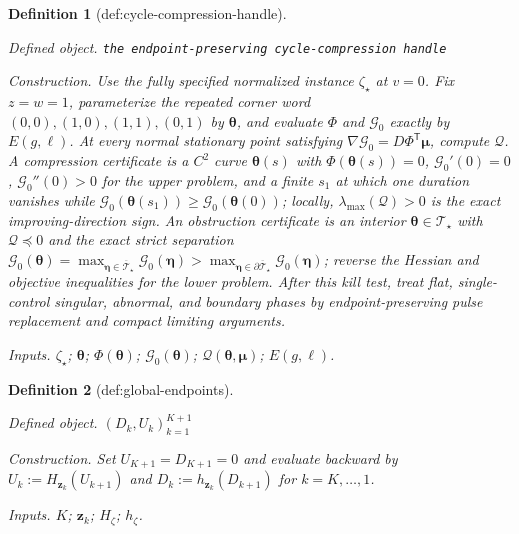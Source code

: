 \documentclass{article}
\newtheorem{definition}{Definition}
\begin{document}
\begin{definition}[def:cycle-compression-handle]\label{def:cycle-compression-handle}
\par\smallskip\noindent\emph{Defined object.} \texttt{the endpoint-\allowbreak{}preserving cycle-\allowbreak{}compression handle}
\par\smallskip\noindent\emph{Construction.} Use the fully specified normalized instance \(\zeta_\star\) at \(v=0\). Fix \(z=w=1\), parameterize the repeated corner word \((0,0),(1,0),(1,1),(0,1)\) by \(\boldsymbol\theta\), and evaluate \(\Phi\) and \(\mathcal G_0\) exactly by \(E(g,\ell)\). At every normal stationary point satisfying \(\nabla\mathcal G_0=D\Phi^{\mathsf T}\boldsymbol\mu\), compute \(\mathscr Q\). A compression certificate is a \(C^2\) curve \(\boldsymbol\theta(s)\) with \(\Phi(\boldsymbol\theta(s))=0\), \(\mathcal G_0'(0)=0\), \(\mathcal G_0''(0)>0\) for the upper problem, and a finite \(s_1\) at which one duration vanishes while \(\mathcal G_0(\boldsymbol\theta(s_1))\ge\mathcal G_0(\boldsymbol\theta(0))\); locally, \(\lambda_{\max}(\mathscr Q)>0\) is the exact improving-direction sign. An obstruction certificate is an interior \(\boldsymbol\theta\in\mathcal T_\star\) with \(\mathscr Q\preceq0\) and the exact strict separation \(\mathcal G_0(\boldsymbol\theta)=\max_{\boldsymbol\eta\in\overline{\mathcal T}_\star}\mathcal G_0(\boldsymbol\eta)>\max_{\boldsymbol\eta\in\partial\overline{\mathcal T}_\star}\mathcal G_0(\boldsymbol\eta)\); reverse the Hessian and objective inequalities for the lower problem. After this kill test, treat flat, single-control singular, abnormal, and boundary phases by endpoint-preserving pulse replacement and compact limiting arguments.
\par\smallskip\noindent\emph{Inputs.} \(\zeta_\star\); \(\boldsymbol\theta\); \(\Phi(\boldsymbol\theta)\); \(\mathcal G_0(\boldsymbol\theta)\); \(\mathscr Q(\boldsymbol\theta,\boldsymbol\mu)\); \(E(g,\ell)\).
\end{definition}

\begin{definition}[def:global-endpoints]\label{def:global-endpoints}
\par\smallskip\noindent\emph{Defined object.} \((D_k,U_k)_{k=1}^{K+1}\)
\par\smallskip\noindent\emph{Construction.} Set \(U_{K+1}=D_{K+1}=0\) and evaluate backward by \(U_k:=H_{\mathbf z_k}(U_{k+1})\) and \(D_k:=h_{\mathbf z_k}(D_{k+1})\) for \(k=K,\ldots,1\).
\par\smallskip\noindent\emph{Inputs.} \(K\); \(\mathbf z_k\); \(H_{\zeta}\); \(h_{\zeta}\).
\end{definition}
\end{document}

